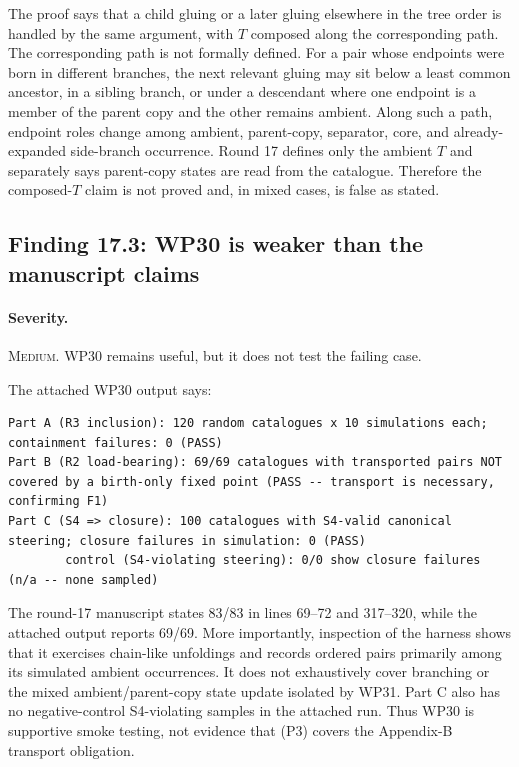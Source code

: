 \documentclass[11pt]{article}
\newcommand{\sev}[1]{\textsc{#1}}
\begin{document}
The proof says that a child gluing or a later gluing elsewhere in the tree order is handled by the same argument, with $T$ composed along the corresponding path.  The corresponding path is not formally defined.  For a pair whose endpoints were born in different branches, the next relevant gluing may sit below a least common ancestor, in a sibling branch, or under a descendant where one endpoint is a member of the parent copy and the other remains ambient.  Along such a path, endpoint roles change among ambient, parent-copy, separator, core, and already-expanded side-branch occurrence.  Round 17 defines only the ambient $T$ and separately says parent-copy states are read from the catalogue.  Therefore the composed-$T$ claim is not proved and, in mixed cases, is false as stated.

\subsection{Finding 17.3: WP30 is weaker than the manuscript claims}

\paragraph{Severity.} \sev{Medium}.  WP30 remains useful, but it does not test the failing case.

The attached WP30 output says:
\begin{lstlisting}[style=reviewtext]
Part A (R3 inclusion): 120 random catalogues x 10 simulations each; containment failures: 0 (PASS)
Part B (R2 load-bearing): 69/69 catalogues with transported pairs NOT covered by a birth-only fixed point (PASS -- transport is necessary, confirming F1)
Part C (S4 => closure): 100 catalogues with S4-valid canonical steering; closure failures in simulation: 0 (PASS)
        control (S4-violating steering): 0/0 show closure failures (n/a -- none sampled)
\end{lstlisting}
The round-17 manuscript states 83/83 in lines 69--72 and 317--320, while the attached output reports 69/69.  More importantly, inspection of the harness shows that it exercises chain-like unfoldings and records ordered pairs primarily among its simulated ambient occurrences.  It does not exhaustively cover branching or the mixed ambient/parent-copy state update isolated by WP31.  Part C also has no negative-control S4-violating samples in the attached run.  Thus WP30 is supportive smoke testing, not evidence that (P3) covers the Appendix-B transport obligation.
\end{document}
